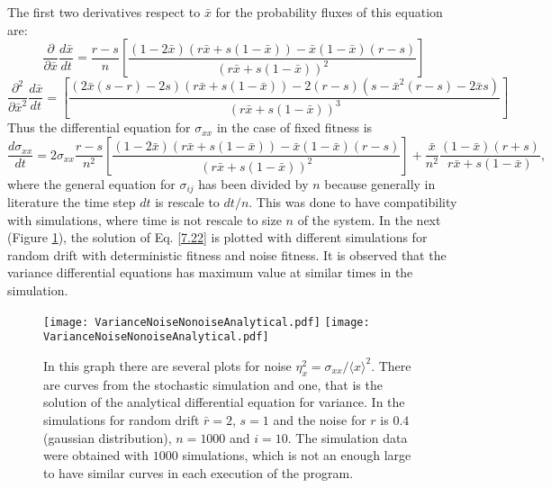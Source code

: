 The first two derivatives respect to $\bar{x}$ for the probability fluxes of this equation are:
\begin{equation}
\frac{\partial}{\partial\bar{x}}\frac{d\bar{x}}{dt}=\frac{r-s}{n}\left[\frac{(1-2\bar{x})(r\bar{x}+s(1-\bar{x}))-\bar{x}(1-\bar{x})(r-s)}{\left(r\bar{x}+s(1-\bar{x})\right)^{2}}\right]
\end{equation} 
\begin{equation}
\frac{\partial^{2}}{\partial\bar{x}^{2}}\frac{d\bar{x}}{dt}=\left[\frac{(2\bar{x}(s-r)-2s)(r\bar{x}+s(1-\bar{x}))-2(r-s)(s-\bar{x}^{2}(r-s)-2\bar{x}s)}{\left(r\bar{x}+s(1-\bar{x})\right)^{3}}\right]
\end{equation}
Thus the differential equation for $\sigma_{xx}$ in the case of fixed fitness is
\begin{equation}\label{7.22}
\frac{d\sigma_{xx}}{dt}=2\sigma_{xx}\frac{r-s}{n^2}\left[\frac{(1-2\bar{x})(r\bar{x}+s(1-\bar{x}))-\bar{x}(1-\bar{x})(r-s)}{\left(r\bar{x}+s(1-\bar{x})\right)^{2}}\right] + \frac{\bar{x}}{n^{2}}\frac{(1-\bar{x})(r+s)}{r\bar{x}+s(1-\bar{x})},
\end{equation}
where the general equation for $\sigma_{ij}$ has been divided by $n$ because generally in literature the time step $dt$ is rescale to $dt/n$. This was done to have compatibility with simulations, where time is not rescale to  size $n$ of the system. In the next (Figure \ref{Fig7.5}), the solution of Eq. \eqref{7.22} is plotted with different simulations for random drift with deterministic fitness and noise fitness. It is observed that the variance differential equations has  maximum value at similar times in the simulation.  
\begin{figure}[H]
  \begin{center}
    \leavevmode
    \ifpdf
      \texttt{[image: VarianceNoiseNonoiseAnalytical.pdf]}
    \else
      \texttt{[image: VarianceNoiseNonoiseAnalytical.pdf]}
    \fi
    \caption{In this graph there are several plots for  noise $\eta_{x}^{2}=\sigma_{xx}/\langle x\rangle^2$. There are curves from the stochastic simulation and one, that is the solution of the analytical differential equation for variance. In the simulations for random drift $\bar{r}=2$, $s=1$ and the noise for $r$ is $0.4$(gaussian distribution), $n=1000$ and $i=10$. The simulation data were obtained with $1000$ simulations, which is not an enough large to have similar curves in each execution of the program.}
    \label{Fig7.5}
  \end{center}
  \end{figure}

